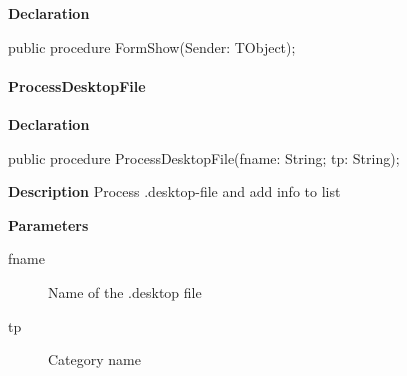 \documentclass{report}
\newif\ifpdf
\begin{document}
\label{manager.TMnFrm-FormShow}
\begin{list}{}{
\setlength{\itemindent}{0cm}
\setlength{\listparindent}{0cm}
\setlength{\leftmargin}{\evensidemargin}
\addtolength{\leftmargin}{\tmplength}
\settowidth{\labelsep}{X}
\addtolength{\leftmargin}{\labelsep}
\setlength{\labelwidth}{\tmplength}
}
\item[\textbf{Declaration}\hfill]
\ifpdf
\begin{flushleft}
\fi
\begin{ttfamily}
public procedure FormShow(Sender: TObject);\end{ttfamily}

\ifpdf
\end{flushleft}
\fi

\end{list}
\paragraph*{ProcessDesktopFile}\hspace*{\fill}

\label{manager.TMnFrm-ProcessDesktopFile}
\begin{list}{}{
\setlength{\itemindent}{0cm}
\setlength{\listparindent}{0cm}
\setlength{\leftmargin}{\evensidemargin}
\addtolength{\leftmargin}{\tmplength}
\settowidth{\labelsep}{X}
\addtolength{\leftmargin}{\labelsep}
\setlength{\labelwidth}{\tmplength}
}
\item[\textbf{Declaration}\hfill]
\ifpdf
\begin{flushleft}
\fi
\begin{ttfamily}
public procedure ProcessDesktopFile(fname: String; tp: String);\end{ttfamily}

\ifpdf
\end{flushleft}
\fi

\par
\item[\textbf{Description}]
Process .desktop{-}file and add info to list  \par
\item[\textbf{Parameters}]
\begin{description}
\item[fname] Name of the .desktop file
\item[tp] Category name
\end{description}


\end{list}
\end{document}

